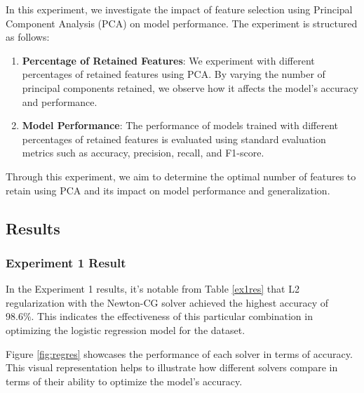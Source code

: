 \documentclass[a4paper,10pt,twocolumn]{article}
\begin{document}
In this experiment, we investigate the impact of feature selection using Principal Component Analysis (PCA) on model performance. The experiment is structured as follows:

\begin{enumerate}
    \item \textbf{Percentage of Retained Features}: We experiment with different percentages of retained features using PCA. By varying the number of principal components retained, we observe how it affects the model's accuracy and performance.
    
    \item \textbf{Model Performance}: The performance of models trained with different percentages of retained features is evaluated using standard evaluation metrics such as accuracy, precision, recall, and F1-score.

\end{enumerate}

Through this experiment, we aim to determine the optimal number of features to retain using PCA and its impact on model performance and generalization.

\subsection{Results}

\subsubsection{Experiment 1 Result}

In the Experiment 1 results, it's notable from Table \ref{ex1res} that L2 regularization with the Newton-CG solver achieved the highest accuracy of 98.6\%. This indicates the effectiveness of this particular combination in optimizing the logistic regression model for the dataset.

Figure \ref{fig:regres} showcases the performance of each solver in terms of accuracy. This visual representation helps to illustrate how different solvers compare in terms of their ability to optimize the model's accuracy.
\end{document}
